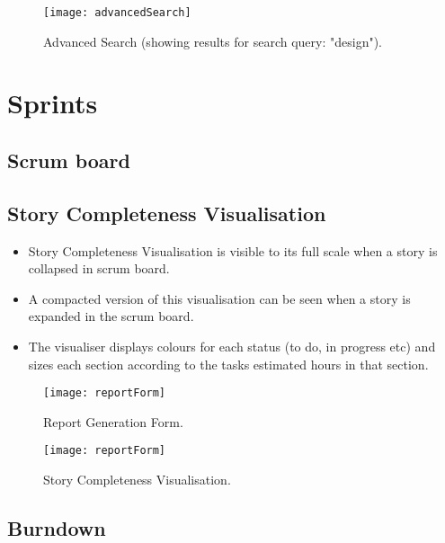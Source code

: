 \documentclass[11pt,fleqn]{book} %
\begin{document}
\begin{figure}[H]
  \centering
  \texttt{[image: advancedSearch]}
  \caption{Advanced Search (showing results for search query: "design").\label{advancedSearch}}
\end{figure}

\chapter{Sprints}

\section{Scrum board}

\section{Story Completeness Visualisation}
\begin{itemize}
\item Story Completeness Visualisation is visible to its full scale when a story is collapsed in scrum board.
\item A compacted version of this visualisation can be seen when a story is expanded in the scrum board.
\item The visualiser displays colours for each status (to do, in progress etc) and sizes each section according to the tasks estimated hours in that section.
\end{itemize}

\begin{figure}[H]
  \centering
  \texttt{[image: reportForm]}
  \caption{Report Generation Form.\label{reportForm}}
\end{figure}


\begin{figure}[H]
  \centering
  \texttt{[image: reportForm]}
  \caption{Story Completeness Visualisation.\label{reportForm}}
\end{figure}

\section{Burndown}

\appendix
\end{document}
